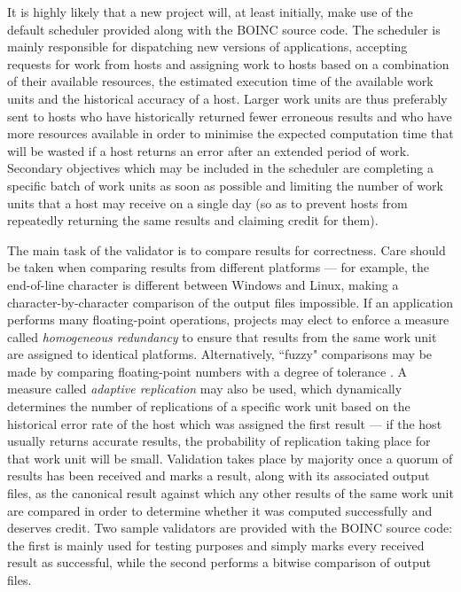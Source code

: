 It is highly likely that a new project will, at least initially, make use of the default scheduler  provided along  with the BOINC source code.
The scheduler is  mainly responsible for dispatching new versions of applications, accepting requests for work from hosts and assigning work to hosts based on a combination of their available resources, the estimated execution time of the available work units and the historical accuracy of a host. Larger work units are thus preferably sent to hosts who have  historically returned fewer erroneous results and who have more resources available in order to minimise the expected computation time that will be wasted if a host returns an error after an extended period of   work.
Secondary objectives which may be included in the scheduler are completing a specific batch of work units as soon as possible and limiting the number of work units that a host may receive on a single day (so as to prevent hosts from repeatedly returning the same results and claiming credit for them).

The main task of the validator is to compare results for correctness. Care should be taken when comparing results from different platforms --- for example, the end-of-line character is different between Windows and Linux, making a character-by-character comparison of the output files impossible. If an application performs many floating-point operations, projects  may elect to enforce a measure called \emph{homogeneous redundancy} to ensure that results from the same work unit are assigned to identical platforms. Alternatively,  ``fuzzy" comparisons may be made by comparing floating-point numbers with a degree of tolerance \cite{boincwiki}. A measure called \emph{adaptive replication} may also be used, which dynamically determines the number of replications of a specific work unit based on the historical error rate of the host which was assigned the first result --- if the host usually returns accurate results, the probability of replication taking place for that work unit will be small.
Validation takes place by majority once a quorum of results has been received and marks a result, along with its associated output files, as the canonical result against which any other results of the same work unit are compared in order to determine whether it was computed successfully and deserves credit.
Two sample validators are provided with the BOINC source code: the first is mainly used for testing purposes and simply marks every received result as successful, while the second performs a bitwise comparison of output files.

